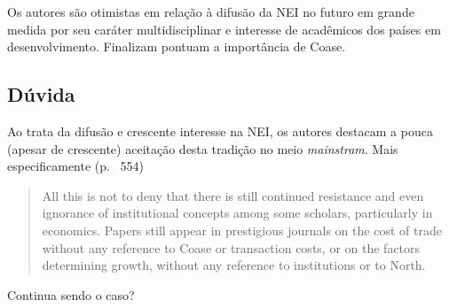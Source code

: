 Os autores são otimistas em relação à difusão da NEI no futuro em grande medida por seu caráter multidisciplinar e interesse de acadêmicos dos países em desenvolvimento. Finalizam pontuam a importância de Coase.

	\begin{sigstatement}
			\sffamily
			{%
				\begin{mdframed}[style=stylesigstyle]%
					\section*{Dúvida}%
Ao trata da difusão e crescente interesse na NEI, os autores destacam a pouca (apesar de crescente) aceitação desta tradição no meio \textit{mainstram}. Mais especificamente (p.~ 554)

\begin{quotation}
All this is not to deny that there is still continued resistance and even ignorance
of institutional concepts among some scholars, particularly in economics.
Papers still appear in prestigious journals on the cost of trade without any
reference to Coase or transaction costs, or on the factors determining growth,
without any reference to institutions or to North. 	
\end{quotation}


Continua sendo o caso?
			\end{mdframed}}
	\end{sigstatement}
